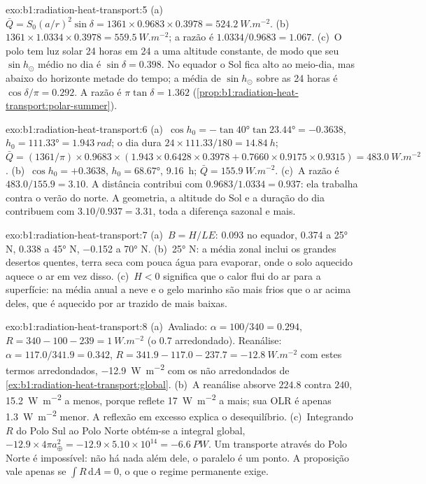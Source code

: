 \begin{solution}{exo:b1:radiation-heat-transport:5}
(a)~$\bar Q = S_0(a/r)^2\sin\delta = 1361 \times 0.9683 \times 0.3978 =
\qty{524.2}{W.m^{-2}}$. (b)~$1361 \times 1.0334 \times 0.3978 =
\qty{559.5}{W.m^{-2}}$; a razão é $1.0334/0.9683 = 1.067$. (c)~O polo tem luz solar 24 horas em 24
a uma altitude constante, de modo que seu $\sin h_\odot$ médio no dia é $\sin\delta = 0.398$. No
equador o Sol fica alto ao meio-dia, mas abaixo do horizonte metade do tempo; a média de
$\sin h_\odot$ sobre as 24 horas é $\cos\delta/\pi =
0.292$. A razão é $\pi\tan\delta = 1.362$ (\cref{prop:b1:radiation-heat-transport:polar-summer}).
\end{solution}

\begin{solution}{exo:b1:radiation-heat-transport:6}
(a)~$\cos h_0 = -\tan\ang{40}\tan\ang{23.44} = -0.3638$, $h_0 = \ang{111.33} =
\qty{1.943}{rad}$; o dia dura $24 \times 111.33/180 = \qty{14.84}{h}$; $\bar Q =
(1361/\pi) \times 0.9683 \times (1.943 \times 0.6428 \times 0.3978 + 0.7660 \times
0.9175 \times 0.9315) = \qty{483.0}{W.m^{-2}}$. (b)~$\cos h_0 = +0.3638$, $h_0 =
\ang{68.67}$, \qty{9.16}{h}; $\bar Q = \qty{155.9}{W.m^{-2}}$. (c)~A razão é
$483.0/155.9 = 3.10$. A distância contribui com $0.9683/1.0334 = 0.937$: ela trabalha contra o
verão do norte. A geometria, a altitude do Sol e a duração do dia contribuem com $3.10/0.937 = 3.31$,
toda a diferença sazonal e mais.
\end{solution}

\begin{solution}{exo:b1:radiation-heat-transport:7}
(a)~$B = H/LE$: \num{0.093} no equador, \num{0.374} a \ang{25} N, \num{0.338} a \ang{45} N,
\num{-0.152} a \ang{70} N. (b)~\ang{25} N: a média zonal inclui os grandes desertos quentes, terra
seca com pouca água para evaporar, onde o solo aquecido aquece o ar em vez disso. (c)~$H < 0$
significa que o calor flui do ar para a superfície: na média anual a neve e o gelo marinho são mais
frios que o ar acima deles, que é aquecido por ar trazido de  mais baixas.
\end{solution}

\begin{solution}{exo:b1:radiation-heat-transport:8}
(a)~Avaliado: $\alpha = 100/340 = 0.294$, $R = 340 - 100 - 239 =
\qty{+1}{W.m^{-2}}$ (o \num{0.7} arredondado). Reanálise: $\alpha = 117.0/341.9 =
0.342$, $R = 341.9 - 117.0 - 237.7 = \qty{-12.8}{W.m^{-2}}$ com estes termos arredondados,
\qty{-12.9}{W.m^{-2}} com os não arredondados de
\cref{ex:b1:radiation-heat-transport:global}. (b)~A reanálise absorve $224.8$ contra $240$,
\qty{15.2}{W.m^{-2}} a menos, porque reflete \qty{17}{W.m^{-2}} a mais; sua OLR é apenas
\qty{1.3}{W.m^{-2}} menor. A reflexão em excesso explica o desequilíbrio. (c)~Integrando $R$ do Polo
Sul ao Polo Norte obtém-se a integral global, $-12.9 \times 4\pi a_\oplus^2 = -12.9 \times
5.10\times10^{14} = \qty{-6.6}{PW}$. Um transporte através do Polo Norte é impossível: não há nada
além dele, o paralelo é um ponto. A proposição vale apenas se $\int R\,\mathrm dA = 0$, o que o
regime permanente exige.
\end{solution}


